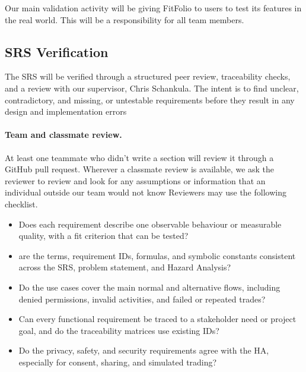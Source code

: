 \documentclass[12pt, titlepage]{article}
\begin{document}
Our main validation activity will be giving FitFolio to users to test
 its features in the real world. This will be a responsibility
for all team members.


\subsection{SRS Verification}



The SRS will be verified through a structured peer review, traceability checks, and a review with our supervisor, Chris Schankula. The intent is to find unclear, contradictory, and missing, or untestable requirements before they result in any design and implementation errors



\paragraph {Team and classmate review.} At least one teammate who didn't write a section will review it through a GitHub pull request. Wherever a classmate review is available, we ask the reviewer to review and look for any assumptions or information that an individual outside our team would not know Reviewers may use the following checklist.



\begin{itemize}

  \item Does each requirement describe one observable behaviour or measurable quality, with a fit criterion that can be tested?

  \item are the terms, requirement IDs, formulas, and symbolic constants consistent across the SRS, problem statement, and Hazard Analysis?

  \item Do the use cases cover the main normal and alternative flows, including denied permissions, invalid activities, and failed or repeated trades?

  \item Can every functional requirement be traced to a stakeholder need or project goal, and do the traceability matrices use existing IDs?

  \item Do the privacy, safety, and security requirements agree with the HA, especially for consent, sharing, and simulated trading?

\end{itemize}
\end{document}
